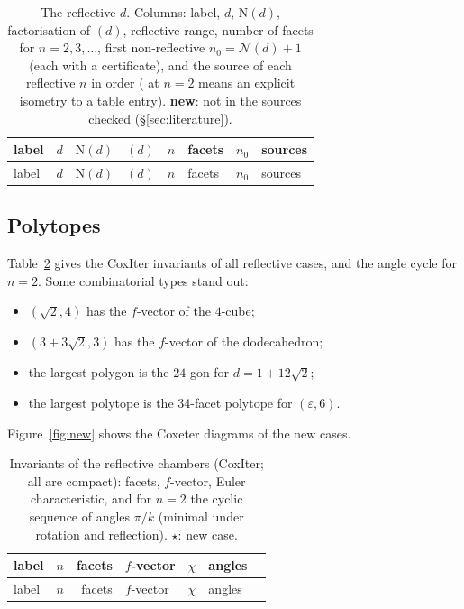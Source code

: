 \documentclass[11pt]{amsart}
\theoremstyle{definition}
\newcommand{\eps}{\varepsilon}
\newcommand{\N}{\mathrm{N}}
\newcommand{\Nmax}{\mathcal{N}}
\begin{document}
{\footnotesize
\begin{longtable}{>{\raggedright}p{1.2cm}lrp{2.4cm}cp{2.0cm}lp{3.0cm}}
\caption{The \NRefl{} reflective $d$. Columns: label, $d$, $\N(d)$, factorisation of $(d)$, reflective
range, number of facets for $n=2,3,\dots$, first non-reflective $n_0=\Nmax(d)+1$ (each with a
certificate), and the source of each reflective $n$ in order (\cite{Mar18} at $n=2$ means an
explicit isometry to a table entry). \textbf{new}: not in the sources checked
(\S\ref{sec:literature}).}\label{tab:reflective}\\
\toprule
label & $d$ & $\N(d)$ & $(d)$ & $n$ & facets & $n_0$ & sources\\
\midrule\endfirsthead
\toprule
label & $d$ & $\N(d)$ & $(d)$ & $n$ & facets & $n_0$ & sources\\
\midrule\endhead

\end{longtable}}

\subsection{Polytopes}
Table~\ref{tab:invariants} gives the CoxIter invariants of all reflective cases, and the
angle cycle for $n=2$. Some combinatorial types stand out:
\begin{itemize}
\item $(\sqrt2,4)$ has the $f$-vector of the $4$-cube;
\item $(3+3\sqrt2,3)$ has the $f$-vector of the dodecahedron;
\item the largest polygon is the $24$-gon for $d=1+12\sqrt2$;
\item the largest polytope is the 34-facet polytope for $(\eps,6)$.
\end{itemize}
Figure~\ref{fig:new} shows the Coxeter diagrams of the new cases.

{\footnotesize
\begin{longtable}{lrrlrll}
\caption{Invariants of the reflective chambers (CoxIter; all are compact): facets,
$f$-vector, Euler characteristic, and for $n=2$ the cyclic sequence of angles $\pi/k$
(minimal under rotation and reflection). $\star$: new case.}\label{tab:invariants}\\
\toprule
label & $n$ & facets & $f$-vector & $\chi$ & angles & \\
\midrule\endfirsthead
\toprule
label & $n$ & facets & $f$-vector & $\chi$ & angles & \\
\midrule\endhead

\end{longtable}}
\end{document}
